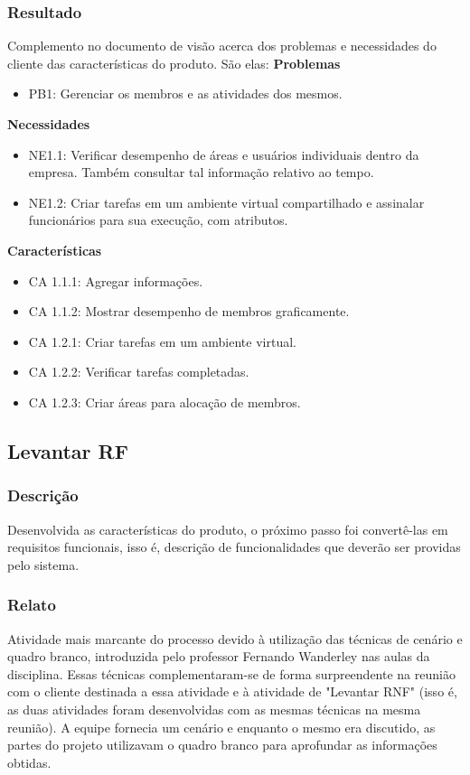 \subsubsection{Resultado}
Complemento no documento de visão acerca dos problemas e necessidades do cliente das características do produto. São elas:
\textbf{Problemas}
\begin{itemize}
\item PB1: Gerenciar os membros e as atividades dos mesmos.
\end{itemize}

\textbf{Necessidades}
\begin{itemize}
\item NE1.1: Verificar desempenho de áreas e usuários individuais dentro da empresa. Também consultar tal informação relativo ao tempo.
\item NE1.2: Criar tarefas em um ambiente virtual compartilhado e assinalar funcionários para sua execução, com atributos.
\end{itemize}

\textbf{Características}
\begin{itemize}
\item CA 1.1.1: Agregar informações.
\item CA 1.1.2: Mostrar desempenho de membros graficamente.
\item CA 1.2.1: Criar tarefas em um ambiente virtual.
\item CA 1.2.2: Verificar tarefas completadas.
\item CA 1.2.3: Criar áreas para alocação de membros.
\end{itemize}

\subsection{Levantar RF}
\subsubsection{Descrição}
Desenvolvida as características do produto, o próximo passo foi convertê-las em requisitos funcionais, isso é, descrição de funcionalidades que deverão ser providas pelo sistema.

\subsubsection{Relato}
Atividade mais marcante do processo devido à utilização das técnicas de cenário e quadro branco, introduzida pelo professor Fernando Wanderley nas aulas da disciplina. Essas técnicas complementaram-se de forma surpreendente na reunião com o cliente destinada a essa atividade e à atividade de "Levantar RNF" (isso é, as duas atividades foram desenvolvidas com as mesmas técnicas na mesma reunião). A equipe fornecia um cenário e enquanto o mesmo era discutido, as partes do projeto utilizavam o quadro branco para aprofundar as informações obtidas.

